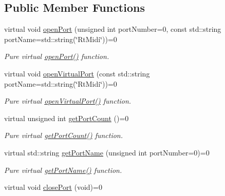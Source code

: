 \subsection*{Public Member Functions}
\begin{DoxyCompactItemize}
\item 
virtual void \hyperlink{class_rt_midi_ad9e30a89638f93193cb40edebaa536f5}{open\+Port} (unsigned int port\+Number=0, const std\+::string port\+Name=std\+::string(\char`\"{}Rt\+Midi\char`\"{}))=0\hypertarget{class_rt_midi_ad9e30a89638f93193cb40edebaa536f5}{}\label{class_rt_midi_ad9e30a89638f93193cb40edebaa536f5}

\begin{DoxyCompactList}\small\item\em Pure virtual \hyperlink{class_rt_midi_ad9e30a89638f93193cb40edebaa536f5}{open\+Port()} function. \end{DoxyCompactList}\item 
virtual void \hyperlink{class_rt_midi_a9200cde4f5337c0bc421d20bd4fcf654}{open\+Virtual\+Port} (const std\+::string port\+Name=std\+::string(\char`\"{}Rt\+Midi\char`\"{}))=0\hypertarget{class_rt_midi_a9200cde4f5337c0bc421d20bd4fcf654}{}\label{class_rt_midi_a9200cde4f5337c0bc421d20bd4fcf654}

\begin{DoxyCompactList}\small\item\em Pure virtual \hyperlink{class_rt_midi_a9200cde4f5337c0bc421d20bd4fcf654}{open\+Virtual\+Port()} function. \end{DoxyCompactList}\item 
virtual unsigned int \hyperlink{class_rt_midi_a9a49ef73a1e6007444019a7ae095e195}{get\+Port\+Count} ()=0\hypertarget{class_rt_midi_a9a49ef73a1e6007444019a7ae095e195}{}\label{class_rt_midi_a9a49ef73a1e6007444019a7ae095e195}

\begin{DoxyCompactList}\small\item\em Pure virtual \hyperlink{class_rt_midi_a9a49ef73a1e6007444019a7ae095e195}{get\+Port\+Count()} function. \end{DoxyCompactList}\item 
virtual std\+::string \hyperlink{class_rt_midi_a799e2b9f4df39b298518f2b394db3391}{get\+Port\+Name} (unsigned int port\+Number=0)=0\hypertarget{class_rt_midi_a799e2b9f4df39b298518f2b394db3391}{}\label{class_rt_midi_a799e2b9f4df39b298518f2b394db3391}

\begin{DoxyCompactList}\small\item\em Pure virtual \hyperlink{class_rt_midi_a799e2b9f4df39b298518f2b394db3391}{get\+Port\+Name()} function. \end{DoxyCompactList}\item 
virtual void \hyperlink{class_rt_midi_a36125c4fa16550345b57f4a4927f5b4a}{close\+Port} (void)=0\hypertarget{class_rt_midi_a36125c4fa16550345b57f4a4927f5b4a}{}\label{class_rt_midi_a36125c4fa16550345b57f4a4927f5b4a}


\end{DoxyCompactItemize}
